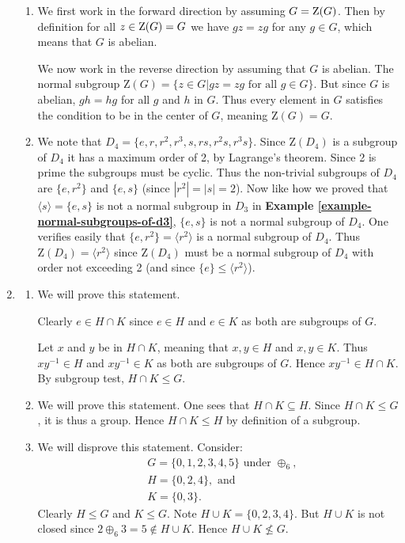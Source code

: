 \begin{enumerate}
\begin{enumerate}[label=(\alph*)]
        \item We first work in the forward direction by assuming $G = \mathrm{Z}(G)$. Then by definition for all $z \in \mathrm{Z}(G) = G$ we have $gz = zg$ for any $g \in G$, which means that $G$ is abelian.

        We now work in the reverse direction by assuming that $G$ is abelian. The normal subgroup $\mathrm{Z}(G) = \{z \in G \vert gz = zg \text{ for all } g \in G\}$. But since $G$ is abelian, $gh = hg$ for all $g$ and $h$ in $G$. Thus every element in $G$ satisfies the condition to be in the center of $G$, meaning $\mathrm{Z}(G) = G$.

        \item We note that $D_4 = \{e, r, r^2, r^3, s, rs, r^2s, r^3s\}$. Since $\mathrm{Z}(D_4)$ is a subgroup of $D_4$ it has a maximum order of 2, by Lagrange's theorem. Since 2 is prime the subgroups must be cyclic. Thus the non-trivial subgroups of $D_4$ are $\{e, r^2\}$ and $\{e, s\}$ (since $|r^2| = |s| = 2$). Now like how we proved that $\langle s \rangle = \{e, s\}$ is not a normal subgroup in $D_3$ in \textbf{Example \ref{example-normal-subgroups-of-d3}}, $\{e, s\}$ is not a normal subgroup of $D_4$. One verifies easily that $\{e, r^2\} = \langle r^2 \rangle$ is a normal subgroup of $D_4$. Thus $\mathrm{Z}(D_4) = \langle r^2 \rangle$ since $\mathrm{Z}(D_4)$ must be a normal subgroup of $D_4$ with order not exceeding 2 (and since $\{e\} \leq \langle r^2 \rangle$).
    \end{enumerate}

    \item \begin{enumerate}[label=(\alph*)]
        \item We will prove this statement.

        Clearly $e \in H \cap K$ since $e \in H$ and $e \in K$ as both are subgroups of $G$.

        Let $x$ and $y$ be in $H \cap K$, meaning that $x, y \in H$ and $x, y \in K$. Thus $xy^{-1} \in H$ and $xy^{-1} \in K$ as both are subgroups of $G$. Hence $xy^{-1} \in H \cap K$.
        By subgroup test, $H \cap K \leq G$.

        \item We will prove this statement. One sees that $H \cap K \subseteq H$. Since $H \cap K \leq G$, it is thus a group. Hence $H \cap K \leq H$ by definition of a subgroup.

        \item We will disprove this statement. Consider:
        \begin{align*}
            &G = \{0, 1, 2, 3, 4, 5\} \text{ under }\oplus_6,\\
            &H = \{0, 2, 4\},\text{ and}\\
            &K = \{0, 3\}.
        \end{align*}
        Clearly $H \leq G$ and $K \leq G$. Note $H \cup K = \{0, 2, 3, 4\}$. But $H \cup K$ is not closed since $2 \oplus_6 3 = 5 \not \in H \cup K$. Hence $H \cup K \not\leq G$.


\end{enumerate}
\end{enumerate}
